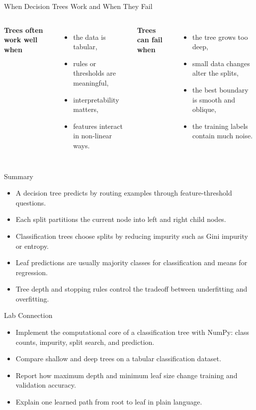 \begin{frame}{When Decision Trees Work and When They Fail}
\begin{columns}[T]
\textbf{Trees often work well when}
\begin{itemize}
  \item the data is tabular,
  \pause
  \item rules or thresholds are meaningful,
  \pause
  \item interpretability matters,
  \pause
  \item features interact in non-linear ways.
\end{itemize}

\pause
{}
\textbf{Trees can fail when}
\begin{itemize}
  \item the tree grows too deep,
  \pause
  \item small data changes alter the splits,
  \pause
  \item the best boundary is smooth and oblique,
  \pause
  \item the training labels contain much noise.
\end{itemize}
\end{columns}
\end{frame}

\begin{frame}{Summary}
\begin{itemize}
  \item A decision tree predicts by routing examples through feature-threshold questions.
  \item Each split partitions the current node into left and right child nodes.
  \item Classification trees choose splits by reducing impurity such as Gini impurity or entropy.
  \item Leaf predictions are usually majority classes for classification and means for regression.
  \item Tree depth and stopping rules control the tradeoff between underfitting and overfitting.
\end{itemize}
\end{frame}

\begin{frame}{Lab Connection}
\begin{itemize}
  \item Implement the computational core of a classification tree with NumPy: class counts, impurity, split search, and prediction.
  \item Compare shallow and deep trees on a tabular classification dataset.
  \item Report how maximum depth and minimum leaf size change training and validation accuracy.
  \item Explain one learned path from root to leaf in plain language.
\end{itemize}
\end{frame}
